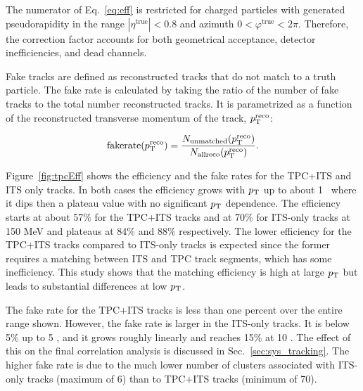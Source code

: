 The numerator of Eq.~\ref{eq:eff} is restricted for charged particles with generated pseudorapidity in the range $|\eta^{\mathrm{true}}|<0.8$ and azimuth $0<\varphi^{\mathrm{true}}<2\pi$. Therefore, the correction factor accounts for both geometrical acceptance, detector inefficiencies, and dead channels.  

Fake tracks are defined as reconstructed tracks that do not match to a truth particle. The fake rate is calculated by taking the ratio of the number of fake tracks to the total number reconstructed tracks. It is parametrized as a function of the reconstructed transverse momentum of the track, $p_{\mathrm{T}}^{\mathrm{reco}}$:

\begin{equation}\label{eq:fakes}
\mathrm{fake rate} (p_{\mathrm{T}}^{\mathrm{reco}}) = \frac{N_{\mathrm{unmatched}}(p_{\mathrm{T}}^{\mathrm{reco}})}{N_{\mathrm{all reco}}(p_{\mathrm{T}}^{\mathrm{reco}})}.
\end{equation}

Figure~\ref{fig:tpcEff} shows the efficiency and the fake rates for the TPC+ITS and ITS only tracks. In both cases the efficiency grows with $p_{\mathrm{T}}$ up to about 1 \GeVc~where it dips then a plateau value with no significant $p_{\mathrm{T}}$ dependence. The efficiency starts at about 57$\%$ for the TPC+ITS tracks and at 70$\%$ for ITS-only tracks at 150 MeV and plateaus at 84\% and 88\% respectively. The lower efficiency for the TPC+ITS tracks compared to ITS-only tracks is expected since the former requires a matching between ITS and TPC track segments, which has some inefficiency. This study shows that the matching efficiency is high at large $p_{\mathrm{T}}$ but leads to substantial differences at low $p_{\mathrm{T}}$.  

The fake rate for the TPC+ITS tracks is less than one percent over the entire range shown. However, the fake rate is larger in the ITS-only tracks. It is below 5\% up to 5 \GeVc, and it grows roughly linearly and reaches 15\%  at 10 \GeVc. The effect of this on the final correlation analysis is discussed in Sec.~\ref{sec:sys_tracking}. The higher fake rate is due to the much lower number of clusters associated with ITS-only tracks (maximum of 6) than to TPC+ITS tracks (minimum of 70).

